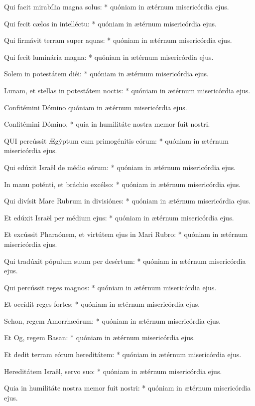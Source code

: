 Qui facit mirabília magna solus: * quóniam in ætérnum misericórdia ejus.

Qui fecit cælos in intelléctu: * quóniam in ætérnum misericórdia ejus.

Qui firmávit terram super aquas: * quóniam in ætérnum misericórdia ejus.

Qui fecit luminária magna: * quóniam in ætérnum misericórdia ejus.

Solem in potestátem diéi: * quóniam in ætérnum misericórdia ejus.

Lunam, et stellas in potestátem noctis: * quóniam in ætérnum misericórdia ejus.

 Confitémini Dómino quóniam in ætérnum misericórdia ejus.

 Confitémini Dómino, * quia in humilitáte nostra memor fuit nostri.


\lettrine[lines=2]{Q}{UI} percússit Ægýptum cum primogénitis eórum: * quóniam in ætérnum misericórdia ejus.

Qui edúxit Israël de médio eórum: * quóniam in ætérnum misericórdia ejus.

In manu poténti, et bráchio excélso: * quóniam in ætérnum misericórdia ejus.

Qui divísit Mare Rubrum in divisiónes: * quóniam in ætérnum misericórdia ejus.

Et edúxit Israël per médium ejus: * quóniam in ætérnum misericórdia ejus.

Et excússit Pharaónem, et virtútem ejus in Mari Rubro: * quóniam in ætérnum misericórdia ejus.

Qui tradúxit pópulum suum per desértum: * quóniam in ætérnum misericórdia ejus.

Qui percússit reges magnos: * quóniam in ætérnum misericórdia ejus.

Et occídit reges fortes: * quóniam in ætérnum misericórdia ejus.

Sehon, regem Amorrhæórum: * quóniam in ætérnum misericórdia ejus.

Et Og, regem Basan: * quóniam in ætérnum misericórdia ejus.

Et dedit terram eórum hereditátem: * quóniam in ætérnum misericórdia ejus.

Hereditátem Israël, servo suo: * quóniam in ætérnum misericórdia ejus.

Quia in humilitáte nostra memor fuit nostri: * quóniam in ætérnum misericórdia ejus.

